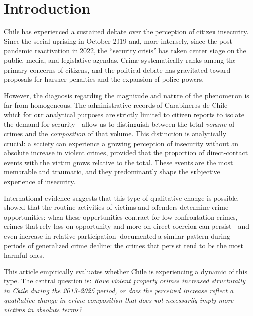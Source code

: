 \documentclass[pdflatex,sn-basic]{sn-jnl}
\begin{document}
\section{Introduction}

Chile has experienced a sustained debate over the perception of citizen insecurity.
Since the social uprising in October 2019 and, more intensely, since the post-pandemic
reactivation in 2022, the ``security crisis'' has taken center stage on the public,
media, and legislative agendas. Crime systematically ranks among the primary concerns
of citizens, and the political debate has gravitated toward proposals for harsher
penalties and the expansion of police powers.

However, the diagnosis regarding the magnitude and nature of the phenomenon is far from
homogeneous. The administrative records of Carabineros de Chile---which for our analytical
purposes are strictly limited to citizen reports to isolate the demand for security---allow 
us to distinguish between the total \emph{volume} of crimes and the \emph{composition} of that 
volume. This distinction is analytically crucial: a society can experience a growing perception
of insecurity without an absolute increase in violent crimes, provided that the proportion
of direct-contact events with the victim grows relative to the total. These events are the
most memorable and traumatic, and they predominantly shape the subjective experience of insecurity.

International evidence suggests that this type of qualitative change is possible.
\citet{cohen1979} showed that the routine activities of victims and offenders determine
crime opportunities: when these opportunities contract for low-confrontation crimes, crimes
that rely less on opportunity and more on direct coercion can persist---and even increase
in relative participation. \citet{blumstein1988} documented a similar pattern during
periods of generalized crime decline: the crimes that persist tend to be the most harmful ones.

This article empirically evaluates whether Chile is experiencing a dynamic of this type.
The central question is: \textit{Have violent property crimes increased structurally in
Chile during the 2013--2025 period, or does the perceived increase reflect a qualitative
change in crime composition that does not necessarily imply more victims in absolute terms?}
\end{document}
